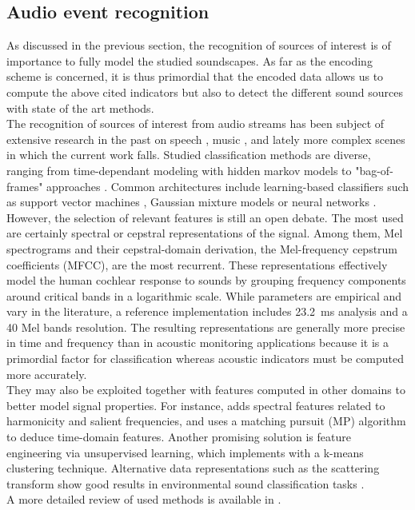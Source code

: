\documentclass[12pt,times,onecolumn]{article}
\begin{document}
\subsection{Audio event recognition}

As discussed in the previous section, the recognition of sources of interest is of importance to fully model the studied soundscapes. As far as the encoding scheme is concerned, it is thus primordial that the encoded data allows us to compute the above cited indicators but also to detect the different sound sources with state of the art methods.\\

The recognition of sources of interest from audio streams has been subject of extensive research in the past on speech \cite{anusuya2009}, music \cite{tzanetakis2002}, and lately more complex scenes in which the current work falls. Studied classification methods are diverse, ranging from time-dependant modeling with hidden markov models \cite{ntalampiras2014} to "bag-of-frames" approaches \cite{aucouturier2007, foggia2015}. Common architectures include learning-based classifiers such as support vector machines \cite{kumar2016}, Gaussian mixture models \cite{radhakrishnan2005} or neural networks \cite{salamon2017, piczak2015}. However, the selection of relevant features is still an open debate. The most used are certainly spectral \cite{khunarsal2013} or cepstral \cite{couvreur2004} representations of the signal. Among them, Mel spectrograms and their cepstral-domain derivation, the Mel-frequency cepstrum coefficients (MFCC), are the most recurrent. These representations effectively model the human cochlear response to sounds by grouping frequency components around critical bands in a logarithmic scale. While parameters are empirical and vary in the literature, a reference implementation includes 23.2~ms analysis and a 40 Mel bands resolution. The resulting representations are generally more precise in time and frequency than in acoustic monitoring applications because it is a primordial factor for classification whereas acoustic indicators must be computed more accurately.\\

They may also be exploited together with features computed in other domains to better model signal properties. For instance, \cite{cai2006} adds spectral features related to harmonicity and salient frequencies, and \cite{chu2009} uses a matching pursuit (MP) algorithm to deduce time-domain features. Another promising solution is feature engineering via unsupervised learning, which \cite{salamon2015-2} implements with a k-means clustering technique. Alternative data representations such as the scattering transform \cite{bauge2013} show good results in environmental sound classification tasks \cite{salamon2015}.\\
A more detailed review of used methods is available in \cite{chachada2013}.
\end{document}
